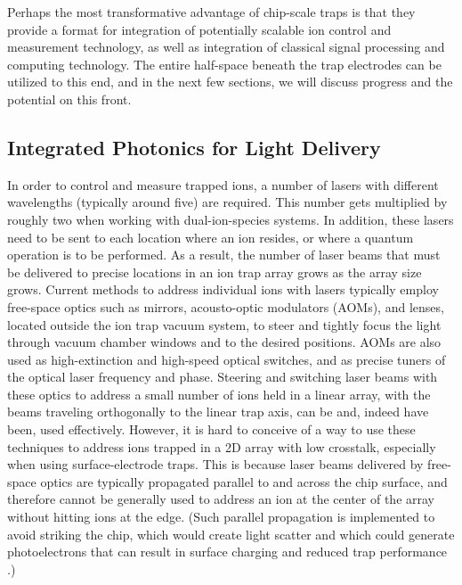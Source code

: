 \documentclass[%
12pt,
 amsmath,amssymb,
]{revtex4-2}
\begin{document}
Perhaps the most transformative advantage of chip-scale traps is that they provide a format for integration of potentially scalable ion control and measurement technology, as well as integration of classical signal processing and computing technology.  The entire half-space beneath the trap electrodes can be utilized to this end, and in the next few sections, we will discuss progress and the potential on this front.

    \subsection{Integrated Photonics for Light Delivery}
    \label{IntPhot}
In order to control and measure trapped ions, a number of lasers with different wavelengths (typically around five) are required.  This number gets multiplied by roughly two when working with dual-ion-species systems.  In addition, these lasers need to be sent to each location where an ion resides, or where a quantum operation is to be performed.  As a result, the number of laser beams that must be delivered to precise locations in an ion trap array grows as the array size grows.  Current methods to address individual ions with lasers typically employ free-space optics such as mirrors, acousto-optic modulators (AOMs), and lenses, located outside the ion trap vacuum system, to steer and tightly focus the light through vacuum chamber windows and to the desired positions.  AOMs are also used as  high-extinction and high-speed optical switches, and as precise tuners of the optical laser frequency and phase.  Steering and switching laser beams with these optics to address a small number of ions held in a linear array, with the beams traveling orthogonally to the linear trap axis, can be and, indeed have been, used effectively.  However, it is hard to conceive of a way to use these techniques to address ions trapped in a 2D array with low crosstalk, especially when using surface-electrode traps.  This is because laser beams delivered by free-space optics are typically propagated parallel to and across the chip surface, and therefore cannot be generally used to address an ion at the center of the array without hitting ions at the edge. (Such parallel propagation is implemented to avoid striking the chip, which would create light scatter and which could generate photoelectrons that can result in surface charging and reduced trap performance \cite{wang2011laser}.)
\end{document}
